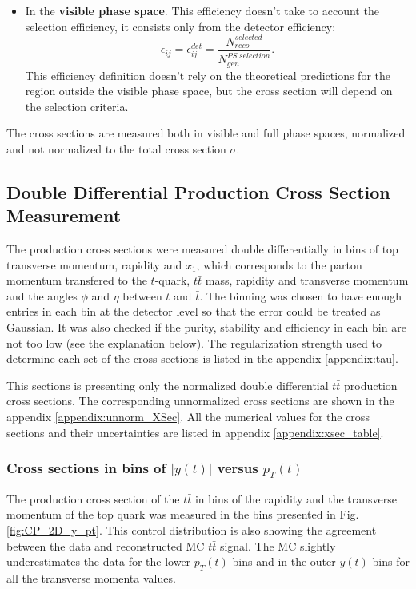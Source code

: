 \begin{itemize}
 \item In the \textbf{visible phase space}. This efficiency doesn't take to account the selection efficiency, it consists only from the detector efficiency:
 \begin{equation}
  \epsilon_{ij} = \epsilon_{ij}^{det} = \frac{N^{selected}_{reco}}{N^{PS\;selection}_{gen}}.
 \end{equation}
 This efficiency definition doesn't rely on the theoretical predictions for the region outside the visible phase space, but the cross section will depend on
 the selection criteria.
\end{itemize}

The cross sections are measured both in visible and full phase spaces, normalized and not normalized to the total cross section $\sigma$. 


\subsection{Double Differential Production Cross Section Measurement}\label{ssec:xsec_mes}

The production cross sections were measured double differentially in bins of top transverse momentum, rapidity and  $x_{1}$,
which corresponds to the parton momentum transfered to the $t$-quark,
$t\bar{t}$ mass, rapidity and transverse momentum and the angles $\phi$ and $\eta$ between $t$ and $\bar{t}$.
The binning was chosen to have enough entries in each bin at the detector level so that the error could be treated as Gaussian.
It was also checked if the purity, stability and efficiency in each bin are not too low (see the explanation below).
The regularization strength used to determine each set of the cross sections is listed in the appendix \ref{appendix:tau}.

This sections is presenting only the normalized double differential $t\bar{t}$ production cross sections. The corresponding
unnormalized cross sections are shown in the appendix \ref{appendix:unnorm_XSec}. All the numerical values for the cross sections
and their uncertainties are listed in appendix \ref{appendix:xsec_table}.

\subsubsection{Cross sections in bins of $|y(t)|$ versus $p_{T}(t)$}

The production cross section of the $t\bar{t}$ in bins of the rapidity and the transverse momentum of the top quark was
measured in the bins presented in Fig. \ref{fig:CP_2D_y_pt}. This control distribution is also showing the agreement between 
the data and reconstructed MC $t\bar{t}$ signal. The MC slightly underestimates the data for the lower $p_{T}(t)$ bins and 
in the outer $y(t)$ bins for all the transverse momenta values.

